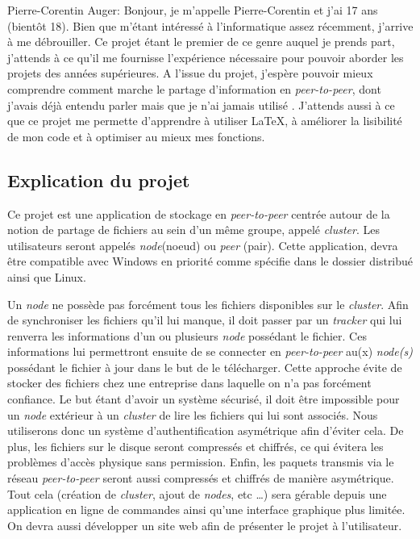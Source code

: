 \documentclass[11pt, a4paper]{specifications}
\begin{document}
\begin{itemize}
  Pierre-Corentin Auger: \og Bonjour, je m’appelle Pierre-Corentin et j’ai 17 ans (bientôt 18). Bien que m’étant intéressé à l’informatique assez récemment, j’arrive à me débrouiller. Ce projet étant le premier de ce genre auquel je prends part, j'attends à ce qu'il me fournisse l’expérience nécessaire pour pouvoir aborder les projets des années supérieures. A l'issue du projet, j'espère pouvoir mieux comprendre comment marche le partage d'information en \textit{peer-to-peer}, dont j'avais déjà entendu parler mais que je n'ai jamais utilisé . J'attends aussi à ce que ce projet me permette d'apprendre à utiliser \LaTeX, à améliorer la lisibilité de mon code et à  optimiser au mieux mes fonctions. \fg
\end{itemize}

    \subsection{Explication du projet}
Ce projet est une application de stockage en \textit{peer-to-peer} centrée autour de la notion de partage de fichiers au sein d'un même groupe, appelé \textit{cluster}. Les utilisateurs seront appelés \textit{node}(noeud) ou \textit{peer} (pair). Cette application, devra être compatible avec Windows en priorité comme spécifie dans le dossier distribué ainsi que Linux.

Un \textit{node} ne possède pas forcément tous les fichiers disponibles sur le \textit{cluster}. Afin de synchroniser les fichiers qu'il lui manque, il doit passer par un \textit{tracker} qui lui renverra les informations d'un ou plusieurs \textit{node} possédant le fichier. Ces informations lui permettront ensuite de se connecter en \textit{peer-to-peer} au(x) \textit{node(s)} possédant le fichier à jour dans le but de le télécharger. Cette approche évite de stocker des fichiers chez une entreprise dans laquelle on n'a pas forcément confiance. Le but étant d'avoir un système sécurisé, il doit être impossible pour un \textit{node} extérieur à un \textit{cluster} de lire les fichiers qui lui sont associés. Nous utiliserons donc un système d'authentification asymétrique afin d'éviter cela. De plus, les fichiers sur le disque seront compressés et chiffrés, ce qui évitera les problèmes d'accès physique sans permission. Enfin, les paquets transmis via le réseau \textit{peer-to-peer} seront aussi compressés et chiffrés de manière asymétrique. Tout cela (création de \textit{cluster}, ajout de \textit{nodes}, etc \ldots) sera gérable depuis une application en ligne de commandes ainsi qu'une interface graphique plus limitée. On devra aussi développer un site web afin de présenter le projet à l'utilisateur.
\end{document}
